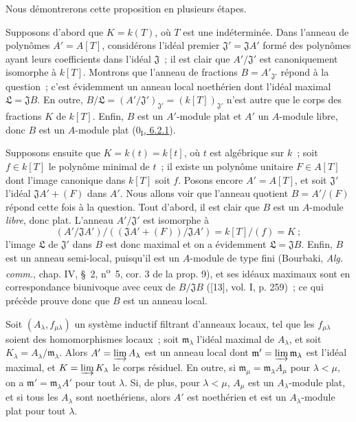 Nous démontrerons cette proposition en plusieurs étapes.

\begin{env}[10.3.1.1]
\label{0.10.3.1.1-fr}
Supposons d'abord que $K=k(T)$, où $T$ est une indéterminée. Dans l'anneau de
polynômes $A'=A[T]$, considérons l'idéal premier
$\mathfrak J'=\mathfrak J A'$ formé des
polynômes ayant leurs coefficients dans l'idéal $\mathfrak J$~; il est clair
que $A'/\mathfrak J'$ est canoniquement isomorphe à $k[T]$. Montrons que
l'anneau de fractions $B=A'_{\mathfrak J'}$ répond à la question~; c'est
évidemment un anneau local noethérien dont l'idéal maximal
$\mathfrak L=\mathfrak J B$. En outre,
$B/\mathfrak L=(A'/\mathfrak J')_{\mathfrak J'}=(k[T])_{\mathfrak J'}$
n'est autre que le corps des fractions $K$ de $k[T]$. Enfin, $B$ est un
$A'$-module plat et $A'$ un $A$-module libre, donc $B$ est un $A$-module plat
(\hyperref[0.6.2.1-fr]{$0_{\mathrm I}$, 6.2.1}).
\end{env}

\begin{env}[10.3.1.2]
\label{0.10.3.1.2-fr}
Supposons ensuite que $K=k(t)=k[t]$, où $t$ est algébrique sur $k$~; soit
$f\in k[T]$ le polynôme minimal de $t$~; il existe un polynôme unitaire
$F\in A[T]$ dont l'image canonique dans $k[T]$ soit $f$. Posons encore
$A'=A[T]$, et soit $\mathfrak J'$ l'idéal $\mathfrak J A'+(F)$ dans $A'$.
Nous allons voir que l'anneau quotient $B=A'/(F)$ répond cette fois à la
question. Tout d'abord, il est clair que $B$ est un $A$-module \emph{libre},
donc plat. L'anneau $A'/\mathfrak J'$ est isomorphe à
\[
  (A'/\mathfrak J A')/((\mathfrak J A'+(F))/\mathfrak J A')
  =k[T]/(f)=K~;
\]
l'image $\mathfrak L$ de $\mathfrak J'$ dans $B$ est donc maximal et on a
évidemment $\mathfrak L=\mathfrak J B$. Enfin, $B$ est un anneau semi-local,
puisqu'il est un $A$-module de type fini (Bourbaki, \emph{Alg. comm.}, chap.
IV, \S~2, n\textsuperscript{o}~5, cor. 3 de la prop. 9), et ses idéaux
maximaux sont en correspondance biunivoque avec ceux de $B/\mathfrak J B$
([13], vol. I, p. 259)~; ce qui précède prouve donc que $B$ est un anneau
local.
\end{env}

\begin{lemma}[10.3.1.3]
\label{0.10.3.1.3-fr}
Soit $(A_\lambda,f_{\mu\lambda})$ un système inductif filtrant d'anneaux
locaux, tel que les $f_{\mu\lambda}$ soient des homomorphismes locaux~; soit
$\mathfrak m_\lambda$ l'idéal maximal de $A_\lambda$, et soit
$K_\lambda=A_\lambda/\mathfrak m_\lambda$. Alors
$A'=\varinjlim A_\lambda$ est un anneau local dont
$\mathfrak m'=\varinjlim\mathfrak m_\lambda$ est l'idéal maximal, et
$K=\varinjlim K_\lambda$ le corps résiduel. En outre, si
$\mathfrak m_\mu=\mathfrak m_\lambda A_\mu$ pour $\lambda<\mu$, on a
$\mathfrak m'=\mathfrak m_\lambda A'$ pour tout $\lambda$. Si, de plus, pour
$\lambda<\mu$, $A_\mu$ est un $A_\lambda$-module plat, et si tous les
$A_\lambda$ sont noethériens, alors $A'$ est noethérien et est un
$A_\lambda$-module plat pour tout $\lambda$.
\end{lemma}

